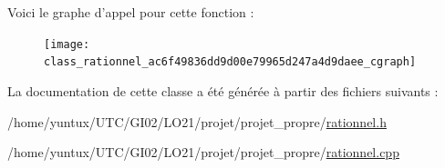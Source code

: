 \-Voici le graphe d'appel pour cette fonction \-:\nopagebreak
\begin{figure}[H]
\begin{center}
\leavevmode
\texttt{[image: class\_rationnel\_ac6f49836dd9d00e79965d247a4d9daee\_cgraph]}
\end{center}
\end{figure}




\-La documentation de cette classe a été générée à partir des fichiers suivants \-:\begin{DoxyCompactItemize}
\item 
/home/yuntux/\-U\-T\-C/\-G\-I02/\-L\-O21/projet/projet\-\_\-propre/\hyperlink{rationnel_8h}{rationnel.\-h}\item 
/home/yuntux/\-U\-T\-C/\-G\-I02/\-L\-O21/projet/projet\-\_\-propre/\hyperlink{rationnel_8cpp}{rationnel.\-cpp}\end{DoxyCompactItemize}
